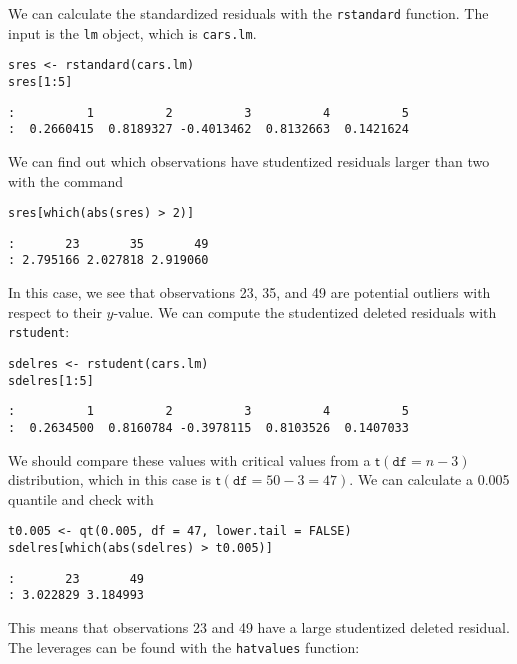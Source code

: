 We can calculate the standardized residuals with the \texttt{rstandard}
function. The input is the \texttt{lm} object, which is \texttt{cars.lm}.

\begin{verbatim}
sres <- rstandard(cars.lm)
sres[1:5]
\end{verbatim}

\begin{verbatim}
:          1          2          3          4          5 
:  0.2660415  0.8189327 -0.4013462  0.8132663  0.1421624
\end{verbatim}

We can find out which observations have studentized residuals larger
than two with the command

\begin{verbatim}
sres[which(abs(sres) > 2)]
\end{verbatim}

\begin{verbatim}
:       23       35       49 
: 2.795166 2.027818 2.919060
\end{verbatim}

In this case, we see that observations 23, 35, and 49 are potential
outliers with respect to their \(y\)-value.  We can compute the
studentized deleted residuals with \texttt{rstudent}:

\begin{verbatim}
sdelres <- rstudent(cars.lm)
sdelres[1:5]
\end{verbatim}

\begin{verbatim}
:          1          2          3          4          5 
:  0.2634500  0.8160784 -0.3978115  0.8103526  0.1407033
\end{verbatim}

We should compare these values with critical values from a
\(\mathsf{t}(\mathtt{df}=n-3)\) distribution, which in this case is
\(\mathsf{t}(\mathtt{df}=50-3=47)\). We can calculate a 0.005 quantile
and check with

\begin{verbatim}
t0.005 <- qt(0.005, df = 47, lower.tail = FALSE)
sdelres[which(abs(sdelres) > t0.005)]
\end{verbatim}

\begin{verbatim}
:       23       49 
: 3.022829 3.184993
\end{verbatim}

This means that observations 23 and 49 have a large studentized
deleted residual. The leverages can be found with the \texttt{hatvalues}
function:

